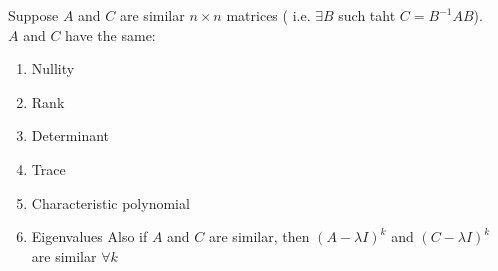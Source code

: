 \documentclass{report}
\begin{document}
    {
       Suppose $ A$ and $ C$ are similar $ n \times  n$ matrices ( i.e. $ \exists  B $ such taht $ C = B^{-1} A B$). \\
       $ A$ and $ C$ have the same:
       \begin{enumerate}[label=(\arabic*).]  
       \item Nullity
       \item Rank
       \item Determinant
	       \item  Trace
	       \item Characteristic polynomial
	       \item Eigenvalues 
		Also if $ A$ and $ C$ are similar, then $ \left( A - \lambda I  \right)^{k} $ and $ \left( C - \lambda I \right) ^{k} $ are similar $ \forall  k$
       \end{enumerate}
       
    }
\end{document}

